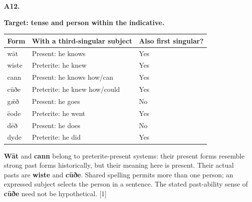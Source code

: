 \par\begin{minipage}{\linewidth}\raggedright
\textbf{A12.}

\textbf{Target: tense and person within the indicative.}

\par\begingroup
\fontsize{10.5}{13.2}\selectfont
\setlength{\LTleft}{0pt}\setlength{\LTright}{\fill}
\noindent
\begin{tabular}{@{}>{\raggedright\arraybackslash}p{26.48mm}>{\raggedright\arraybackslash}p{54.95mm}>{\raggedright\arraybackslash}p{36.94mm}@{}}
\toprule
\textbf{Form} & \textbf{With a third-singular subject} & \textbf{Also first singular?} \\
\midrule
wāt & Present: he knows & Yes \\
wiste & Preterite: he knew & Yes \\
cann & Present: he knows how/\allowbreak{}can & Yes \\
cūðe & Preterite: he knew how/\allowbreak{}could & Yes \\
gǣð & Present: he goes & No \\
ēode & Preterite: he went & Yes \\
dēð & Present: he does & No \\
dyde & Preterite: he did & Yes \\
\bottomrule
\end{tabular}
\par\endgroup

\textbf{Wāt} and \textbf{cann} belong to preterite-present systems: their present forms resemble strong past forms historically, but their meaning here is present. Their actual pasts are \textbf{wiste} and \textbf{cūðe}. Shared spelling permits more than one person; an expressed subject selects the person in a sentence. The stated past-ability sense of \textbf{cūðe} need not be hypothetical. [1]

\end{minipage}\par\addvspace{4pt}

